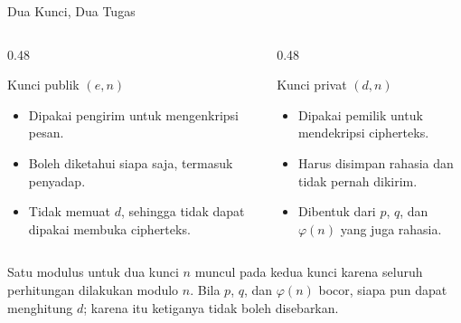 \documentclass[aspectratio=169,11pt]{beamer}
\begin{document}
\begin{frame}{Dua Kunci, Dua Tugas}
    \footnotesize
    \begin{columns}[T,onlytextwidth]
        \begin{column}{0.48\textwidth}
            \begin{block}{Kunci publik $(e,n)$}
                \begin{itemize}
                    \item Dipakai pengirim untuk mengenkripsi pesan.
                    \item Boleh diketahui siapa saja, termasuk penyadap.
                    \item Tidak memuat $d$, sehingga tidak dapat dipakai
                          membuka cipherteks.
                \end{itemize}
            \end{block}
        \end{column}
        \begin{column}{0.48\textwidth}
            \begin{block}{Kunci privat $(d,n)$}
                \begin{itemize}
                    \item Dipakai pemilik untuk mendekripsi cipherteks.
                    \item Harus disimpan rahasia dan tidak pernah dikirim.
                    \item Dibentuk dari $p$, $q$, dan $\varphi(n)$ yang juga
                          rahasia.
                \end{itemize}
            \end{block}
        \end{column}
    \end{columns}
    \vspace{0.15cm}
    \begin{alertblock}{Satu modulus untuk dua kunci}
        \footnotesize
        $n$ muncul pada kedua kunci karena seluruh perhitungan dilakukan
        modulo $n$. Bila $p$, $q$, dan $\varphi(n)$ bocor, siapa pun dapat
        menghitung $d$; karena itu ketiganya tidak boleh disebarkan.
    \end{alertblock}
\end{frame}
\end{document}
